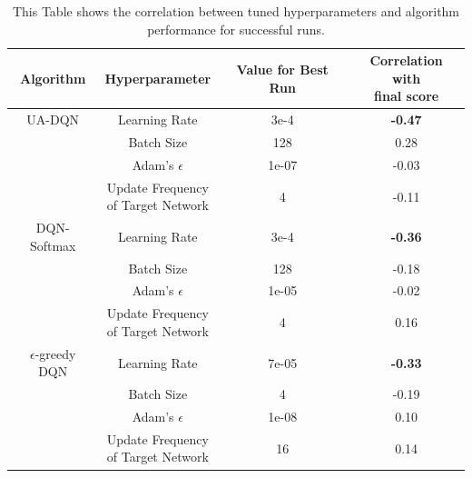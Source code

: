 \begin{table}[h]
  \centering
  \caption{This Table shows the correlation between tuned hyperparameters and algorithm performance for successful runs.}
  \label{tab:hyperparameters}
  \begin{tabular}{c||c|c|c}
    Algorithm & Hyperparameter & Value for Best Run & \makecell{Correlation with \\ final score} \\ \hline 
    UA-DQN & Learning Rate                                & 3e-4 & \bf{-0.47}\\
           & Batch Size                                   & 128 &  0.28\\
           & Adam's $\epsilon$                            & 1e-07 & -0.03\\
           & \makecell{Update Frequency \\of Target Network }& 4 & -0.11\\ \hline
    DQN-Softmax & Learning Rate                                 & 3e-4 & \bf{-0.36} \\
                & Batch Size                                    & 128 & -0.18\\
                & Adam's $\epsilon$                             & 1e-05 & -0.02\\
                & \makecell{Update Frequency \\of Target Network } & 4 &  0.16\\ \hline
    $\epsilon$-greedy DQN & Learning Rate                       & 7e-05 & \bf{-0.33}\\
                & Batch Size                                    & 4 & -0.19\\
                & Adam's $\epsilon$                             & 1e-08 &  0.10\\
                & \makecell{Update Frequency \\of Target Network } & 16 &  0.14

  \end{tabular}
\end{table}



